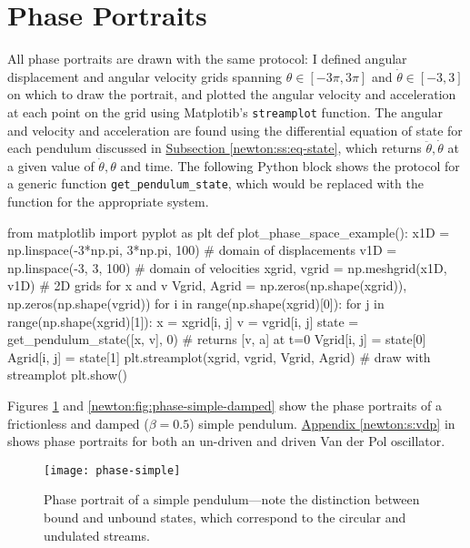 \documentclass[11pt, a4paper]{article}
\begin{document}
\section{Phase Portraits}
All phase portraits are drawn with the same protocol: I defined angular displacement and angular velocity grids spanning $ \theta \in [-3\pi, 3\pi] $ and $ \dot{\theta} \in [-3, 3] $ on which to draw the portrait, and plotted the angular velocity and acceleration at each point on the grid using Matplotib's \texttt{streamplot} function. The angular and velocity and acceleration are found using the differential equation of state for each pendulum discussed in \hyperref[newton:ss:eq-state]{Subsection \ref{newton:ss:eq-state}}, which returns $ \ddot{\theta}, \dot{\theta} $ at a given value of $ \dot{\theta}, \theta $ and time. The following Python block shows the protocol for a generic function \texttt{get\_pendulum\_state}, which would be replaced with the function for the appropriate system.
\begin{python}
from matplotlib import pyplot as plt
def plot_phase_space_example():
    x1D = np.linspace(-3*np.pi, 3*np.pi, 100)  # domain of displacements
    v1D = np.linspace(-3, 3, 100)  # domain of velocities 
    xgrid, vgrid = np.meshgrid(x1D, v1D)  # 2D grids for x and v
    Vgrid, Agrid = np.zeros(np.shape(xgrid)), np.zeros(np.shape(vgrid))
    for i in range(np.shape(xgrid)[0]):
        for j in range(np.shape(xgrid)[1]):
            x = xgrid[i, j]
            v = vgrid[i, j]
            state = get_pendulum_state([x, v], 0)  # returns [v, a] at t=0
            Vgrid[i, j] = state[0]
            Agrid[i, j] = state[1]
    plt.streamplot(xgrid, vgrid, Vgrid, Agrid)  # draw with streamplot
    plt.show()
\end{python}
Figures \ref{newton:fig:phase-simple} and \ref{newton:fig:phase-simple-damped} show the phase portraits of a frictionless and damped ($ \beta = 0.5 $) simple pendulum. \hyperref[newton:s:vdp]{Appendix \ref{newton:s:vdp}} in shows phase portraits for both an un-driven and driven Van der Pol oscillator.

\begin{figure}
\centering
\texttt{[image: phase-simple]}

\caption{Phase portrait of a simple pendulum---note the distinction between bound and unbound states, which correspond to the circular and undulated streams.}

\label{newton:fig:phase-simple}
\end{figure}
\end{document}

